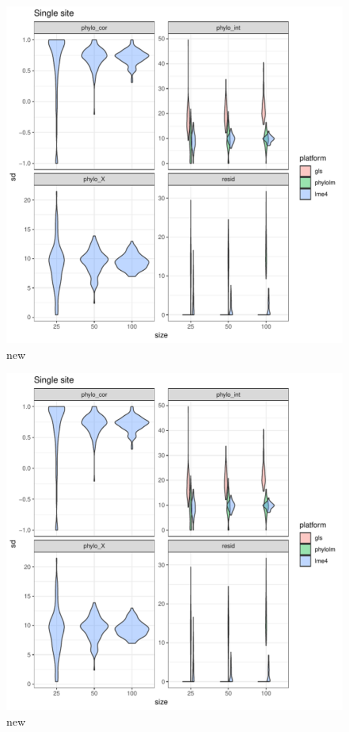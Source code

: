 \documentclass[12pt]{article}
\begin{document}
\begin{center}
\begin{figure}[h]
  \includegraphics[scale=0.8,page=6]{./git_push/plot.Rout.pdf}
  \caption{new}
\end{figure}
\end{center}


\begin{center}
\begin{figure}[h]
  \includegraphics[scale=0.8,page=7]{./git_push/plot.Rout.pdf}
  \caption{new}
\end{figure}
\end{center}
\end{document}
